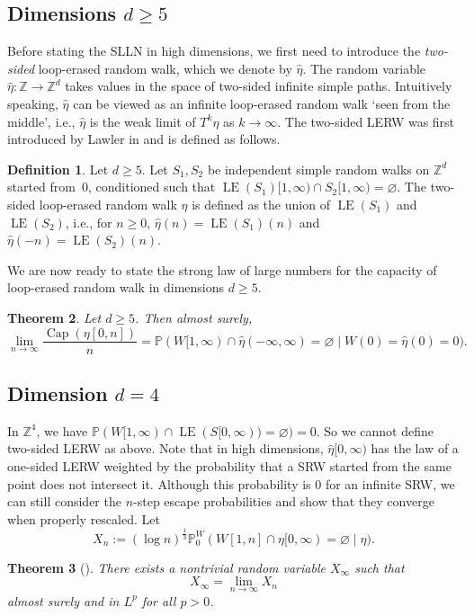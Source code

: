 \documentclass{article}
\DeclareMathOperator{\LE}{LE}
\DeclareMathOperator{\Ca}{Cap}
\newcommand{\Z}{\mathbb{Z}}
\renewcommand{\P}{\mathbb{P}}
\newcommand{\1}{\mathbf{1}}
\newcommand{\limn}{\lim_{n\rightarrow\infty}}
\newcommand{\heta}{\hat\eta}
\newtheorem{theorem}{Theorem}
\theoremstyle{definition}
\newtheorem{definition}[theorem]{Definition}
\numberwithin{equation}{section}
\numberwithin{theorem}{section}
\begin{document}
\subsection{Dimensions \texorpdfstring{$d\geq5$}{d>=5}}\label{sec:d5res}
Before stating the SLLN in high dimensions, we first need to introduce the \emph{two-sided} loop-erased random walk, which we denote by $\heta$. The random variable $\heta\colon\Z\to\Z^d$ takes values in the space of two-sided infinite simple paths. Intuitively speaking, $\heta$ can be viewed as an infinite loop-erased random walk `seen from the middle', i.e., $\heta$ is the weak limit of $T^k\eta$ as $k\rightarrow\infty$. The two-sided LERW was first introduced by Lawler in \cite[Section 5]{lawler80selfavoiding} and is defined as follows.
\begin{definition}\label{def:twosided-lerw}
Let $d\geq5$. Let $S_1,S_2$ be independent simple random walks on $\Z^d$ started from~0, conditioned such that $\LE(S_1)[1,\infty)\cap S_2[1,\infty)=\varnothing$. The two-sided loop-erased random walk $\heta$ is defined as the union of $\LE(S_1)$ and $\LE(S_2)$, i.e., for $n\geq0$, $\heta(n)=\LE(S_1)(n)$ and $\heta(-n)=\LE(S_2)(n)$.
\end{definition}
We are now ready to state the strong law of large numbers for the capacity of loop-erased random walk in dimensions $d\geq5$.
\begin{theorem}\label{th:highdim}
Let $d\geq5$. Then almost surely,
\begin{equation}
    \limn\frac{\Ca(\eta[0,n])}{n}=\P(W[1,\infty)\cap\heta(-\infty,\infty)=\varnothing\mid W(0)=\heta(0)=0).
\end{equation}
\end{theorem}


\subsection{Dimension \texorpdfstring{$d=4$}{d=4}}\label{sec:d4res}
In $\Z^4$, we have $\P(W[1,\infty)\cap\LE(S[0,\infty))=\varnothing)=0$. So we cannot define two-sided LERW as above. Note that in high dimensions, $\heta[0,\infty)$ has the law of a one-sided LERW weighted by the probability that a SRW started from the same point does not intersect it. Although this probability is 0 for an infinite SRW, we can still consider the $n$-step escape probabilities and show that they converge when properly rescaled. Let
\begin{equation}\label{eq:def-Xn-lerw}
	X_n:=(\log n)^{\frac{1}{3}}\P^W_0(W[1,n]\cap\eta[0,\infty)=\varnothing\mid\eta).
\end{equation}
\begin{theorem}[\cite{lawler19fourdimensional}]\label{th:rescaledescapeprob}
There exists a nontrivial random variable $X_\infty$ such that
\begin{equation}\label{eq:def-Xinfty-lerw}
	X_\infty=\limn X_n
\end{equation}
almost surely and in $L^p$ for all $p>0$.
\end{theorem}
\end{document}
